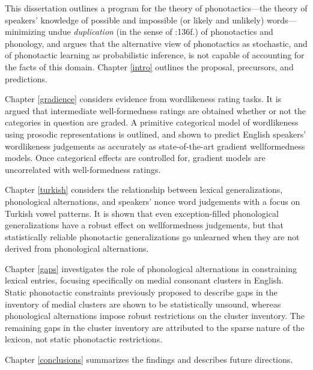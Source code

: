 This dissertation outlines a program for the theory of phonotactics---the theory of speakers' knowledge of possible and impossible (or likely and unlikely) words---minimizing undue \emph{duplication} (in the sense of \citealt{KK77}:136f.) of phonotactics and phonology, and argues that the alternative view of phonotactics as stochastic, and of phonotactic learning as probabilistic inference, is not capable of accounting for the facts of this domain.
Chapter \ref{intro} outlines the proposal, precursors, and predictions. 

Chapter \ref{gradience} considers evidence from wordlikeness rating tasks. It is argued that intermediate well-formedness ratings are obtained whether or not the categories in question are graded. A primitive categorical model of wordlikeness using prosodic representations is outlined, and shown to predict English speakers' wordlikeness judgements as accurately as state-of-the-art gradient wellformedness models. Once categorical effects are controlled for, gradient models are uncorrelated with well-formedness ratings.

Chapter \ref{turkish} considers the relationship between lexical generalizations, phonological alternations, and speakers' nonce word judgements with a focus on Turkish vowel patterns. It is shown that even exception-filled phonological generalizations have a robust effect on wellformedness judgements, but that statistically reliable phonotactic generalizations go unlearned when they are not derived from phonological alternations.

Chapter \ref{gaps} investigates the role of phonological alternations in constraining lexical entries, focusing specifically on medial consonant clusters in English. Static phonotactic constraints previously proposed to describe gaps in the inventory of medial clusters are shown to be statistically unsound, whereas phonological alternations impose robust restrictions on the cluster inventory. The remaining gaps in the cluster inventory are attributed to the sparse nature of the lexicon, not static phonotactic restrictions.

Chapter \ref{conclusions} summarizes the findings and describes future directions.
